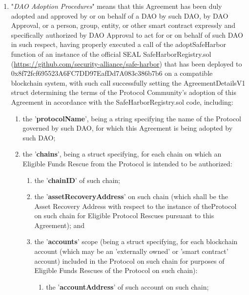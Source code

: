 \documentclass{article}
\begin{document}
\begin{enumerate}[label=\Alph*.]
\begin{enumerate}
\begin{enumerate}
                    \end{enumerate}
          \end{enumerate}

    \item "\textit{DAO Adoption Procedures}" means that this Agreement has been duly adopted and approved by or on behalf of a DAO by such DAO, by DAO Approval, or a person, group, entity, or other smart contract expressly and specifically authorized by DAO Approval to act for or on behalf of such DAO in such respect, having properly executed a call of the adoptSafeHarbor function of an instance of the official SEAL SafeHarborRegistry.sol (\url{https://github.com/security-alliance/safe-harbor}) that has been deployed to 0x8f72fcf695523A6FC7DD97EafDd7A083c386b7b6 on a compatible blockchain system, with such call successfully setting the AgreementDetailsV1 struct determining the terms of the Protocol Community's adoption of this Agreement in accordance with the SafeHarborRegistry.sol code, including:

          \begin{enumerate}
              \item the '\textbf{protocolName}', being a string specifying the name of the Protocol governed by such DAO, for which this Agreement is being adopted by such DAO;

              \item the '\textbf{chains}', being a struct specifying, for each chain on which an Eligible Funds Rescue from the Protocol is intended to be authorized:

                    \begin{enumerate}
                        \item the '\textbf{chainID}' of such chain;

                        \item the '\textbf{assetRecoveryAddress}' on such chain (which shall be the Asset Recovery Address with respect to the instance of theProtocol on such chain for Eligible Protocol Rescues pursuant to this Agreement); and

                        \item the '\textbf{accounts}' scope (being a struct specifying, for each blockchain account (which may be an 'externally owned' or 'smart contract' account) included in the Protocol on such chain for purposes of Eligible Funds Rescues of the Protocol on such chain):

                              \begin{enumerate}
                                  \item the '\textbf{accountAddress}' of such account on such chain;


\end{enumerate}
\end{enumerate}
\end{enumerate}
\end{enumerate}
\end{document}

